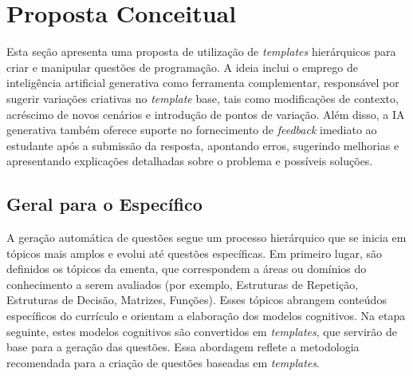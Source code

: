 \chapter{Proposta Conceitual}

Esta seção apresenta uma proposta de utilização de \textit{templates} hierárquicos para criar e manipular questões de programação. A ideia inclui o emprego de inteligência artificial generativa como ferramenta complementar, responsável por sugerir variações criativas no \textit{template} base, tais como modificações de contexto, acréscimo de novos cenários e introdução de pontos de variação. Além disso, a IA generativa também oferece suporte no fornecimento de \textit{feedback} imediato ao estudante após a submissão da resposta, apontando erros, sugerindo melhorias e apresentando explicações detalhadas sobre o problema e possíveis soluções. 

\section{Geral para o Específico}
A geração automática de questões segue um processo hierárquico que se inicia em tópicos mais amplos e evolui até questões específicas. Em primeiro lugar, são definidos os tópicos da ementa, que correspondem a áreas ou domínios do conhecimento a serem avaliados (por exemplo, Estruturas de Repetição, Estruturas de Decisão, Matrizes, Funções). Esses tópicos abrangem conteúdos específicos do currículo e orientam a elaboração dos modelos cognitivos. Na etapa seguinte, estes modelos cognitivos são convertidos em \textit{templates}, que servirão de base para a geração das questões. Essa abordagem reflete a metodologia recomendada para a criação de questões baseadas em \textit{templates}. 

